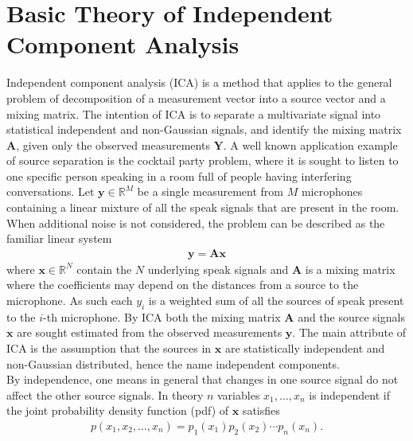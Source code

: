 \section{Basic Theory of Independent Component Analysis}
Independent component analysis (ICA) is a method that applies to  the general problem of decomposition of a measurement vector into a source vector and a mixing matrix. 
The intention of ICA is to separate a multivariate signal into statistical independent and non-Gaussian signals, and identify the mixing matrix $\mathbf{A}$, given only the observed measurements $\mathbf{Y}$.
A well known application example of source separation is the cocktail party problem, where it is sought to listen to one specific person speaking in a room full of people having interfering conversations. 
Let $\mathbf{y} \in \mathbb{R}^M$ be a single measurement from $M$ microphones containing a linear mixture of all the speak signals that are present in the room. 
When additional noise is not considered, the problem can be described as the familiar linear system 
\begin{align}\label{eq:ICA1}
\mathbf{y} = \mathbf{Ax}
\end{align}
where $\mathbf{x}\in \mathbb{R}^N$ contain the $N$ underlying speak signals and $\mathbf{A}$ is a mixing matrix where the coefficients may depend on the distances from a source to the microphone. 
As such each $y_i$ is a weighted sum of all the sources of speak present to the $i$-th microphone.
By ICA both the mixing matrix $\mathbf{A}$ and the source signals $\mathbf{x}$ are sought estimated from the observed measurements $\mathbf{y}$. 
The main attribute of ICA is the assumption that the sources in $\mathbf{x}$ are statistically independent and non-Gaussian distributed, hence the name independent components.
\\     
By independence, one means in general that changes in one source signal do not affect the other source signals. 
In theory $n$ variables $x_1, \hdots , x_n$ is independent if the joint probability density function (pdf) of $\mathbf{x}$ satisfies
\begin{align*}
p(x_1, x_2, \dots, x_n) = p_1(x_1) p_2(x_2) \cdots p_n(x_n).
\end{align*}


